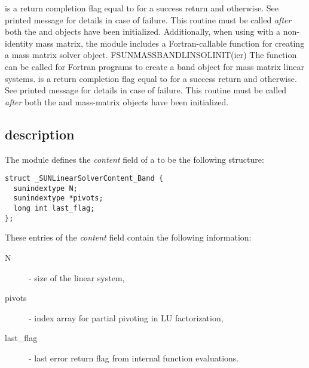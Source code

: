{
   is a return completion flag equal to  for a success
  return and  otherwise. See printed message for details in case
  of failure.
}
{
  This routine must be
  called \emph{after} both the {\nvector} and {\sunmatrix} objects have
  been initialized.
}
Additionally, when using {\arkode} with a non-identity
mass matrix, the {\sunlinsolband} module includes a Fortran-callable
function for creating a  mass matrix solver
object.
{
  FSUNMASSBANDLINSOLINIT(ier)
}
{
  The function  can be called for Fortran programs
  to create a band  object for mass matrix linear
  systems.
}
{
}
{
   is a  return completion flag equal to  for a success
  return and  otherwise. See printed message for details in case
  of failure.
}
{
  This routine must be
  called \emph{after} both the {\nvector} and {\sunmatrix} mass-matrix
  objects have been initialized.
}

\subsection{{\sunlinsolband} description}\label{ss:sunlinsol_band_description}



The {\sunlinsolband} module defines the {\em
content} field of a  to be the following structure:
\begin{verbatim} 
struct _SUNLinearSolverContent_Band {
  sunindextype N;
  sunindextype *pivots;
  long int last_flag;
};
\end{verbatim}
These entries of the \emph{content} field contain the following
information:
\begin{description}
  \item[N] - size of the linear system,
  \item[pivots] - index array for partial pivoting in LU factorization,
  \item[last\_flag] - last error return flag from internal function evaluations.
\end{description}

